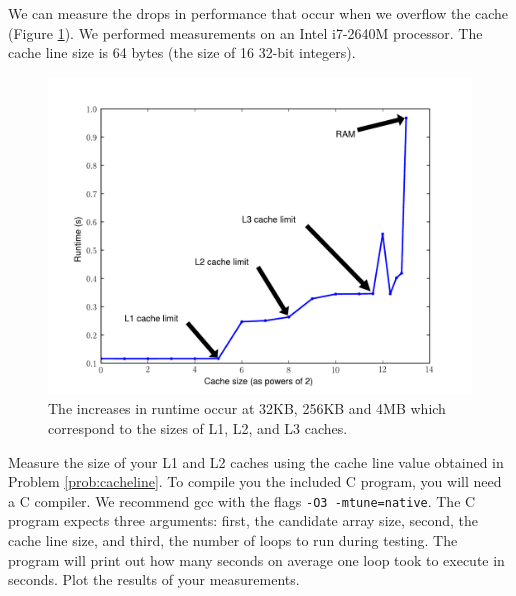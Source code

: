 We can measure the drops in performance that occur when we overflow the cache (Figure \ref{fig:cachesizes}).
We performed measurements on an Intel i7-2640M processor.  The cache line size is 64 bytes (the size of 16 32-bit integers).
\begin{figure}[h]
\centering
\includegraphics[width=\textwidth]{cache_size.pdf}
\caption{The increases in runtime occur at 32KB, 256KB and 4MB which correspond to the sizes of L1, L2, and L3 caches.}
\label{fig:cachesizes}
\end{figure}

\begin{problem}
Measure the size of your L1 and L2 caches using the cache line value obtained in
Problem \ref{prob:cacheline}.  
To compile you the included C program, you will need a C compiler.
We recommend gcc with the flags \texttt{-O3 -mtune=native}.
The C program expects three arguments: first, the candidate array size, second, the cache line size, and third, the number of loops to run during testing.
The program will print out how many seconds on average one loop took to execute in seconds.
Plot the results of your measurements.
\end{problem}

